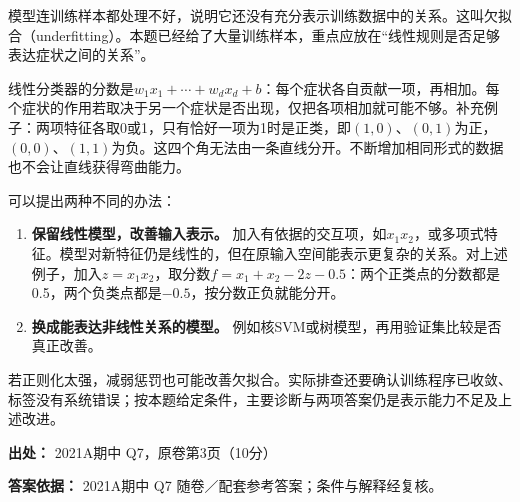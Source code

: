 模型连训练样本都处理不好，说明它还没有充分表示训练数据中的关系。这叫欠拟合（underfitting）。本题已经给了大量训练样本，重点应放在“线性规则是否足够表达症状之间的关系”。


线性分类器的分数是\(w_1x_1+\cdots+w_dx_d+b\)：每个症状各自贡献一项，再相加。每个症状的作用若取决于另一个症状是否出现，仅把各项相加就可能不够。补充例子：两项特征各取0或1，只有恰好一项为1时是正类，即\((1,0)\)、\((0,1)\)为正，\((0,0)\)、\((1,1)\)为负。这四个角无法由一条直线分开。不断增加相同形式的数据也不会让直线获得弯曲能力。


可以提出两种不同的办法：



\begin{enumerate}[start=1]

\item \textbf{保留线性模型，改善输入表示。} 加入有依据的交互项，如\(x_1x_2\)，或多项式特征。模型对新特征仍是线性的，但在原输入空间能表示更复杂的关系。对上述例子，加入\(z=x_1x_2\)，取分数\(f=x_1+x_2-2z-0.5\)：两个正类点的分数都是0.5，两个负类点都是\(-0.5\)，按分数正负就能分开。

\item \textbf{换成能表达非线性关系的模型。} 例如核SVM或树模型，再用验证集比较是否真正改善。

\end{enumerate}


若正则化太强，减弱惩罚也可能改善欠拟合。实际排查还要确认训练程序已收敛、标签没有系统错误；按本题给定条件，主要诊断与两项答案仍是表示能力不足及上述改进。


\textbf{出处：} 2021A期中 Q7，原卷第3页（10分）


\textbf{答案依据：} 2021A期中 Q7 随卷／配套参考答案；条件与解释经复核。
